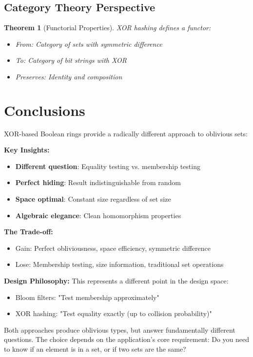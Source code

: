 \documentclass[11pt,final,hidelinks]{article}
\newtheorem{theorem}{Theorem}[section]
\begin{document}
\subsection{Category Theory Perspective}

\begin{theorem}[Functorial Properties]
XOR hashing defines a functor:
\begin{itemize}
    \item From: Category of sets with symmetric difference
    \item To: Category of bit strings with XOR
    \item Preserves: Identity and composition
\end{itemize}
\end{theorem}

\section{Conclusions}

XOR-based Boolean rings provide a radically different approach to oblivious sets:

\textbf{Key Insights:}
\begin{itemize}
    \item \textbf{Different question}: Equality testing vs. membership testing
    \item \textbf{Perfect hiding}: Result indistinguishable from random
    \item \textbf{Space optimal}: Constant size regardless of set size
    \item \textbf{Algebraic elegance}: Clean homomorphism properties
\end{itemize}

\textbf{The Trade-off:}
\begin{itemize}
    \item Gain: Perfect obliviousness, space efficiency, symmetric difference
    \item Lose: Membership testing, size information, traditional set operations
\end{itemize}

\textbf{Design Philosophy:}
This represents a different point in the design space:
\begin{itemize}
    \item Bloom filters: "Test membership approximately"
    \item XOR hashing: "Test equality exactly (up to collision probability)"
\end{itemize}

Both approaches produce oblivious types, but answer fundamentally different questions. The choice depends on the application's core requirement: Do you need to know if an element is in a set, or if two sets are the same?


\end{document}
